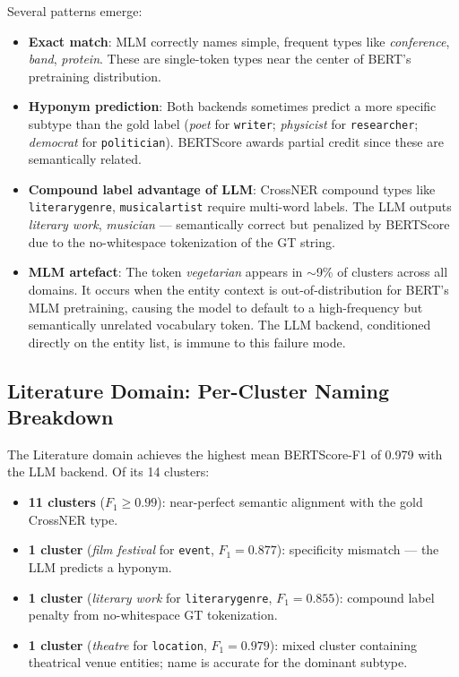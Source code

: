\documentclass[11pt,a4paper]{article}
\begin{document}
Several patterns emerge:
\begin{itemize}[noitemsep]
  \item \textbf{Exact match}: MLM correctly names simple, frequent types like \textit{conference}, \textit{band}, \textit{protein}. These are single-token types near the center of BERT's pretraining distribution.
  \item \textbf{Hyponym prediction}: Both backends sometimes predict a more specific subtype than the gold label (\textit{poet} for \texttt{writer}; \textit{physicist} for \texttt{researcher}; \textit{democrat} for \texttt{politician}). BERTScore awards partial credit since these are semantically related.
  \item \textbf{Compound label advantage of LLM}: CrossNER compound types like \texttt{literarygenre}, \texttt{musicalartist} require multi-word labels. The LLM outputs \textit{literary work}, \textit{musician} — semantically correct but penalized by BERTScore due to the no-whitespace tokenization of the GT string.
  \item \textbf{MLM artefact}: The token \textit{vegetarian} appears in $\sim$9\% of clusters across all domains. It occurs when the entity context is out-of-distribution for BERT's MLM pretraining, causing the model to default to a high-frequency but semantically unrelated vocabulary token. The LLM backend, conditioned directly on the entity list, is immune to this failure mode.
\end{itemize}

\subsection{Literature Domain: Per-Cluster Naming Breakdown}

The Literature domain achieves the highest mean BERTScore-F1 of 0.979 with the LLM backend. Of its 14 clusters:
\begin{itemize}[noitemsep]
  \item \textbf{11 clusters} ($F_1 \geq 0.99$): near-perfect semantic alignment with the gold CrossNER type.
  \item \textbf{1 cluster} (\textit{film festival} for \texttt{event}, $F_1 = 0.877$): specificity mismatch — the LLM predicts a hyponym.
  \item \textbf{1 cluster} (\textit{literary work} for \texttt{literarygenre}, $F_1 = 0.855$): compound label penalty from no-whitespace GT tokenization.
  \item \textbf{1 cluster} (\textit{theatre} for \texttt{location}, $F_1 = 0.979$): mixed cluster containing theatrical venue entities; name is accurate for the dominant subtype.
\end{itemize}
\end{document}
